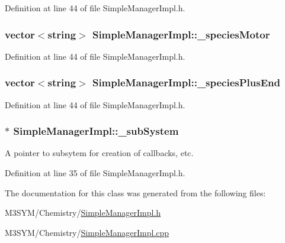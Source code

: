 Definition at line 44 of file Simple\+Manager\+Impl.\+h.

\hypertarget{classSimpleManagerImpl_a5ff19b12a756eaba341d179b795ed6b4}{
\subsubsection[{\+\_\+species\+Motor}]{\setlength{\rightskip}{0pt plus 5cm}vector$<$string$>$ Simple\+Manager\+Impl\+::\+\_\+species\+Motor\hspace{0.3cm}{\ttfamily [private]}}}\label{classSimpleManagerImpl_a5ff19b12a756eaba341d179b795ed6b4}


Definition at line 44 of file Simple\+Manager\+Impl.\+h.

\hypertarget{classSimpleManagerImpl_a8c41d3d46a0534a7127d5b863718bcba}{
\subsubsection[{\+\_\+species\+Plus\+End}]{\setlength{\rightskip}{0pt plus 5cm}vector$<$string$>$ Simple\+Manager\+Impl\+::\+\_\+species\+Plus\+End\hspace{0.3cm}{\ttfamily [private]}}}\label{classSimpleManagerImpl_a8c41d3d46a0534a7127d5b863718bcba}


Definition at line 44 of file Simple\+Manager\+Impl.\+h.

\hypertarget{classSimpleManagerImpl_a3815d1181b7c1a25aca95701dd6d8188}{
\subsubsection[{\+\_\+sub\+System}]{$\ast$ Simple\+Manager\+Impl\+::\+\_\+sub\+System\hspace{0.3cm}{\ttfamily [private]}}}\label{classSimpleManagerImpl_a3815d1181b7c1a25aca95701dd6d8188}


A pointer to subsytem for creation of callbacks, etc. 



Definition at line 35 of file Simple\+Manager\+Impl.\+h.



The documentation for this class was generated from the following files\+:\begin{DoxyCompactItemize}
\item 
M3\+S\+Y\+M/\+Chemistry/\hyperlink{SimpleManagerImpl_8h}{Simple\+Manager\+Impl.\+h}\item 
M3\+S\+Y\+M/\+Chemistry/\hyperlink{SimpleManagerImpl_8cpp}{Simple\+Manager\+Impl.\+cpp}\end{DoxyCompactItemize}
